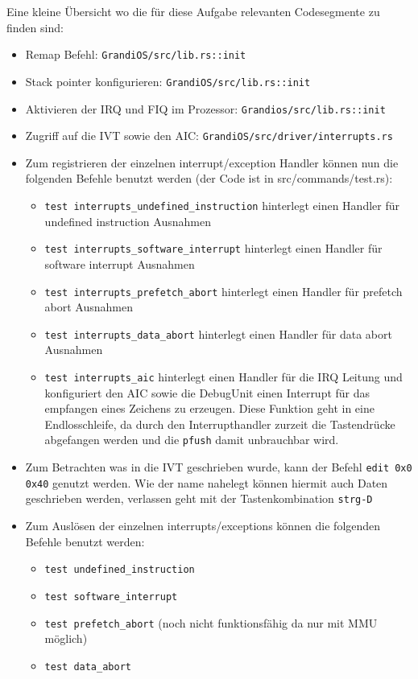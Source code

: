 \begin{description}
Eine kleine Übersicht wo die für diese Aufgabe relevanten Codesegmente zu finden sind:
\begin{itemize}
	\item Remap Befehl: \texttt{GrandiOS/src/lib.rs::init}
	\item Stack pointer konfigurieren: \texttt{GrandiOS/src/lib.rs::init}
	\item Aktivieren der IRQ und FIQ im Prozessor: \texttt{Grandios/src/lib.rs::init}
	\item Zugriff auf die IVT sowie den AIC: \texttt{GrandiOS/src/driver/interrupts.rs}
	\item Zum registrieren der einzelnen interrupt/exception Handler können nun die folgenden Befehle benutzt werden (der Code ist in src/commands/test.rs):
	\begin{itemize}
		\item \texttt{test interrupts\_undefined\_instruction} hinterlegt einen Handler für undefined instruction Ausnahmen
		\item \texttt{test interrupts\_software\_interrupt} hinterlegt einen Handler für software interrupt Ausnahmen
		\item \texttt{test interrupts\_prefetch\_abort} hinterlegt einen Handler für prefetch abort Ausnahmen
		\item \texttt{test interrupts\_data\_abort} hinterlegt einen Handler für data abort Ausnahmen
		\item \texttt{test interrupts\_aic} hinterlegt einen Handler für die IRQ Leitung und konfiguriert den AIC sowie die DebugUnit einen Interrupt für das empfangen eines Zeichens zu erzeugen. Diese Funktion geht in eine Endlosschleife, da durch den Interrupthandler zurzeit die Tastendrücke abgefangen werden und die \texttt{pfush} damit unbrauchbar wird.
	\end{itemize}
	\item Zum Betrachten was in die IVT geschrieben wurde, kann der Befehl \texttt{edit 0x0 0x40} genutzt werden. Wie der name nahelegt können hiermit auch Daten geschrieben werden, verlassen geht mit der Tastenkombination \texttt{strg-D}
        \item Zum Auslösen der einzelnen interrupts/exceptions können die folgenden Befehle benutzt werden:
	\begin{itemize}
		\item \texttt{test undefined\_instruction}
		\item \texttt{test software\_interrupt}
		\item \texttt{test prefetch\_abort} (noch nicht funktionsfähig da nur mit MMU möglich)
		\item \texttt{test data\_abort}
	\end{itemize}
\end{itemize}

\end{description}


